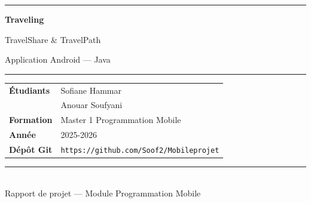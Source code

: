 \documentclass[a4paper,12pt,openany]{report}
\begin{document}
\pagestyle{empty}

\begin{titlepage}
\centering
\vspace*{2cm}

{\color{navy}\rule{\textwidth}{1.5pt}}
\vspace{1cm}

{\fontsize{42}{50}\selectfont\bfseries\color{navy} Traveling\par}
\vspace{0.3cm}
{\large\color{teal} TravelShare \& TravelPath\par}
\vspace{0.2cm}
{\normalsize\color{gray} Application Android — Java\par}

\vspace{1cm}
{\color{navy}\rule{\textwidth}{0.5pt}}

\vspace{2.5cm}

\begin{tabular}{ll}
  \textbf{Étudiants} & Sofiane Hammar \quad  \quad \\[4pt]
                     & Anouar Soufyani \quad  \quad  \\[14pt]
  \textbf{Formation} & Master 1 Programmation Mobile \\[4pt]
  \textbf{Année}     & 2025-2026 \\[14pt]
  \textbf{Dépôt Git} & \texttt{https://github.com/Soof2/Mobileprojet}
\end{tabular}

\vfill
{\color{bord}\rule{\textwidth}{0.5pt}}\\[4pt]
{\small\color{gray} Rapport de projet — Module Programmation Mobile}
\end{titlepage}

\nopagecolor
\pagestyle{fancy}
\tableofcontents
\clearpage
\end{document}
